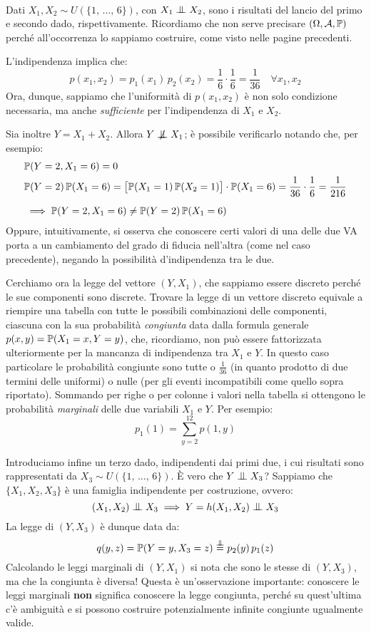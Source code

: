 \bigskip
\begin{ese}~\\
  Dati $X_1, X_2 \sim U(\{1, \, \dots, \, 6\})$, con $X_1 \indep X_2$, sono i risultati del lancio del primo e secondo dado, rispettivamente. Ricordiamo che non serve precisare $(\Omega, \mathcal A, \mathbb P)$ perché all'occorrenza lo sappiamo costruire, come visto nelle pagine precedenti.

  L'indipendenza implica che:
  $$p(x_1, x_2) = p_1(x_1) \, p_2(x_2) = \frac{1}{6} \cdot \frac{1}{6} = \frac{1}{36} \quad \forall x_1,x_2$$
  Ora, dunque, sappiamo che l'uniformità di $p(x_1,x_2)$ è non solo condizione necessaria, ma anche \emph{sufficiente} per l'indipendenza di $X_1$ e $X_2$.

  Sia inoltre $Y = X_1 + X_2$. Allora $Y \centernot\indep X_1$; è possibile verificarlo notando che, per esempio:
  \begin{align*}
    &\mathbb P(Y=2,X_1=6) = 0\\
    &\mathbb P(Y=2) \, \mathbb P(X_1=6) = \big[ \mathbb P(X_1 = 1) \, \mathbb P(X_2 = 1) \big] \cdot \mathbb P(X_1 = 6) = \frac{1}{36} \cdot \frac{1}{6} = \frac{1}{216}\\[5pt]
    & \implies \mathbb P(Y=2,X_1=6) \neq \mathbb P(Y=2) \, \mathbb P(X_1=6)
  \end{align*}
  Oppure, intuitivamente, si osserva che conoscere certi valori di una delle due VA porta a un cambiamento del grado di fiducia nell'altra (come nel caso precedente), negando la possibilità d'indipendenza tra le due.

  Cerchiamo ora la legge del vettore $(Y,X_1)$, che sappiamo essere discreto perché le sue componenti sono discrete.
  Trovare la legge di un vettore discreto equivale a riempire una tabella con tutte le possibili combinazioni delle componenti, ciascuna con la sua probabilità \emph{congiunta} data dalla formula generale $p(x,y) = \mathbb P(X_1 = x, Y = y)$, che, ricordiamo, non può essere fattorizzata ulteriormente per la mancanza di indipendenza tra $X_1$ e $Y$.
  In questo caso particolare le probabilità congiunte sono tutte o $\frac{1}{36}$ (in quanto prodotto di due termini delle uniformi) o nulle (per gli eventi incompatibili come quello sopra riportato).
  Sommando per righe o per colonne i valori nella tabella si ottengono le probabilità \emph{marginali} delle due variabili $X_1$ e $Y$.
  Per esempio:
  $$p_1(1) = \sum_{y=2}^{12} p(1,y)$$

  Introduciamo infine un terzo dado, indipendenti dai primi due, i cui risultati sono rappresentati da $X_3 \sim U( \{ 1, \, \dots, \, 6 \} )$. È vero che $Y \indep X_3$? Sappiamo che $\{X_1,X_2,X_3\}$ è una famiglia indipendente per costruzione, ovvero:
  $$(X_1,X_2) \indep X_3 \implies Y = h(X_1,X_2) \indep X_3$$
  La legge di $(Y,X_3)$ è dunque data da:
  $$q(y,z) = \PP(Y = y, X_3 = z) \stackrel{\indep}{=} p_2(y) \, p_1(z)$$
  Calcolando le leggi marginali di $(Y,X_1)$ si nota che sono le stesse di $(Y,X_3)$, ma che la congiunta è diversa!
  Questa è un'osservazione importante: conoscere le leggi marginali \textbf{non} significa conoscere la legge congiunta, perché su quest'ultima c'è ambiguità e si possono costruire potenzialmente infinite congiunte ugualmente valide.
\end{ese}

